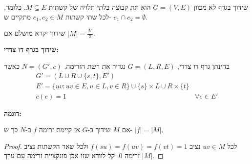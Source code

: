 שידוך בגרף לא מכוון
$G = (V, E)$
הוא תת קבוצה בלתי תלויה של קשתות 
$M \subseteq E$.
כלומר, לכל שתי קשתות 
$e_1, e_2 \in M$
מתקיים ש-%
$e_1 \cap e_2 = \emptyset$.

\begin{definition}
שידוך יקרא מושלם אם 
$|M| = \frac{|V|}{2}$.
\end{definition}

\textbf{שידוך בגרף דו צדדי:}

בהינתן גרף דו צדדי,
$G = (L, R, E)$
נגדיר את רשת הזרימה,
$N = (G', c)$
כאשר
$$
\begin{array}{ll}
G' = (L \cup R \cup \{s, t\}, E')
\\
E' = \{uv : uv \in E, u \in L, v \in R\} \cup \{s\} \times L \cup R \times \{t\}
\\
c(e) = 1 & \forall e \in E'
\end{array}
$$

\textbf{דוגמה:}

\begin{center}
\end{center}


\begin{claim}
אם $M$ שידוך ב-$G$ אז קיימת זרימה $f$ ב-$N$ כך ש-%
$|f| = |M|$.

\begin{proof}
לכל 
$uv \in M$
נציב
$f(su) = f(uv) = f(vt) = 1$
ולכל שאר הקשתות נציב זרימה 0.
קל לוודא שזו אכן פונקציית זרימה עם ערך 
$|M|$.
\end{proof}
\end{claim}

